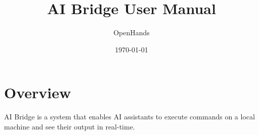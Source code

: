 \documentclass{article}
\title{AI Bridge User Manual}
\author{OpenHands}
\date{\today}
\begin{document}
\maketitle

\section{Overview}
AI Bridge is a system that enables AI assistants to execute commands on a local machine and see their output in real-time.
\end{document}
